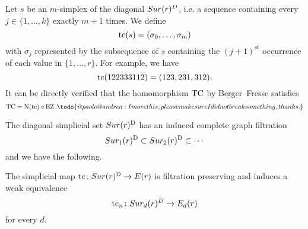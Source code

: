 
Let $s$ be an $m$-simplex of the diagonal $Sur(r)^D$, i.e. a sequence containing every $j \in \{1,\dots,k\}$ exactly $m+1$ times.
We define
\[
\operatorname{tc}(s) = (\sigma_0,\dots,\sigma_m)
\]
with $\sigma_j$ represented by the subsequence of $s$ containing the $(j+1)^{\mathrm{st}}$ occurrence of each value in $\{1,\dots,r\}$.
For example, we have
\[
\operatorname{tc}(122333112) = (123,231,312).
\]
It can be directly verified that the homomorphism $\operatorname{TC}$ by Berger--Fresse satisfies
\[
\TC = \chains(\tc) \circ \EZ.\todo{@paolo@andrea: I move this, please make sure I did not break something, thanks.}
\]

The diagonal simplicial set $Sur(r)^{\mathrm{D}}$ has an induced complete graph filtration
\[
Sur_1(r)^{\mathrm{D}} \subset Sur_2(r)^{\mathrm{D}} \subset \dotsb
\]
and we have the following.

\begin{theorem}
	The simplicial map $\operatorname{tc} \colon Sur(r)^{\mathrm{D}} \to E(r)$ is filtration preserving and induces a weak equivalence
	\[
	\operatorname{tc}_{n} \colon Sur_d(r)^{D} \to E_d(r)
	\]
	for every $d$.
\end{theorem}

